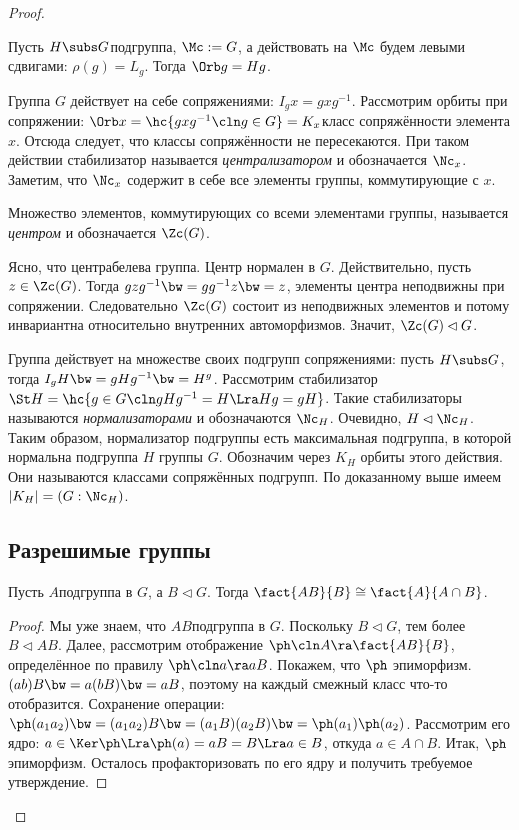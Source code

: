 \documentclass[a4paper]{article}
\newcommand{\kph}{\Ker \ph}
\begin{document}
\begin{proof}
\begin{ex}
Пусть $H \subs G$\т подгруппа, $\Mc := G$, а действовать на $\Mc$ будем левыми  сдвигами: $\rho(g) = L_g$.
Тогда $\Orb g = Hg$.
\end{ex}

\begin{ex}
Группа $G$ действует на себе сопряжениями: $I_g x=gxg^{-1}$. Рассмотрим орбиты  при сопряжении: $\Orb x =
\hc{gxg^{-1}\cln g \in G} = K_x$\т класс сопряжённости элемента $x$. Отсюда следует, что классы сопряжённости не
пересекаются. При таком действии стабилизатор называется \emph{централизатором} и обозначается $\Nc_x$.
Заметим, что $\Nc_x$ содержит в себе все элементы группы, коммутирующие с $x$.
\end{ex}

\begin{df}
Множество элементов, коммутирующих со всеми элементами группы, называется  \emph{центром} и
обозначается $\Zc(G)$.
\end{df}

Ясно, что центр\т абелева группа. Центр нормален в $G$. Действительно, пусть $z \in \Zc(G)$. Тогда
$gzg^{-1}\bw=gg^{-1}z\bw=z$,  элементы центра неподвижны при сопряжении. Следовательно $\Zc(G)$ состоит из
неподвижных элементов и потому инвариантна относительно внутренних автоморфизмов. Значит, $\Zc(G) \lhd G$.

\begin{ex}
Группа действует на множестве своих подгрупп сопряжениями: пусть $H \subs G$,  тогда $I_g H \bw= gHg^{-1} \bw=
H^g$. Рассмотрим стабилизатор $\St H = \hc{g \in G\cln gHg^{-1}=H \Lra Hg = gH}$. Такие стабилизаторы называются
\emph{нормализаторами} и обозначаются $\Nc_H$. Очевидно, $H \lhd \Nc_H$. Таким образом, нормализатор
подгруппы есть максимальная подгруппа, в которой нормальна подгруппа $H$ группы $G$. Обозначим через $K_H$
орбиты этого действия. Они называются классами сопряжённых подгрупп. По доказанному выше имеем $|K_H| =
(G: \Nc_H)$.
\end{ex}

\subsection{Разрешимые группы}

\begin{theorem}
Пусть $A$\т подгруппа в $G$, а $B \lhd G$. Тогда $\fact{AB}{B} \cong \fact{A}{A \cap B}$.
\end{theorem}
\begin{proof}
Мы уже знаем, что $AB$\т подгруппа в $G$. Поскольку $B \lhd G$, тем более  $B \lhd AB$. Далее, рассмотрим
отображение $\ph\cln A \ra \fact{AB}{B}$, определённое по правилу $\ph\cln a \ra aB$. Покажем, что $\ph$\т
эпиморфизм. $(ab)B \bw= a(bB) \bw= aB$, поэтому на каждый смежный класс что-то отобразится. Сохранение операции:
$\ph(a_1a_2) \bw= (a_1a_2)B \bw= (a_1B)(a_2B) \bw= \ph(a_1)\ph(a_2)$. Рассмотрим его ядро: $a \in \kph \Lra \ph(a)=aB=B \Lra
a \in B$, откуда $a \in A \cap B$. Итак, $\ph$\т эпиморфизм. Осталось профакторизовать по его ядру и получить
требуемое утверждение.
\end{proof}


\end{proof}
\end{document}
